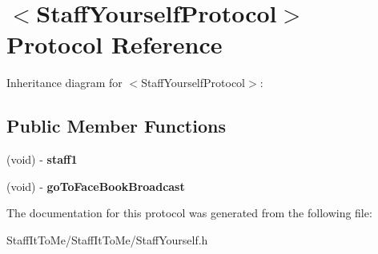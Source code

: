 \hypertarget{protocol_staff_yourself_protocol-p}{
\section{$<$\-Staff\-Yourself\-Protocol$>$ \-Protocol \-Reference}
\label{protocol_staff_yourself_protocol-p}
}


\-Inheritance diagram for $<$\-Staff\-Yourself\-Protocol$>$\-:
\subsection*{\-Public \-Member \-Functions}
\begin{DoxyCompactItemize}
\item 
\hypertarget{protocol_staff_yourself_protocol-p_ab40cba6a24793b656ce1fb7ebf9e71ed}{
(void) -\/ {\bfseries staff1}}
\label{protocol_staff_yourself_protocol-p_ab40cba6a24793b656ce1fb7ebf9e71ed}

\item 
\hypertarget{protocol_staff_yourself_protocol-p_a488ff815ad7cfb59ffdc05e65f9ee6eb}{
(void) -\/ {\bfseries go\-To\-Face\-Book\-Broadcast}}
\label{protocol_staff_yourself_protocol-p_a488ff815ad7cfb59ffdc05e65f9ee6eb}

\end{DoxyCompactItemize}


\-The documentation for this protocol was generated from the following file\-:\begin{DoxyCompactItemize}
\item 
\-Staff\-It\-To\-Me/\-Staff\-It\-To\-Me/\-Staff\-Yourself.\-h\end{DoxyCompactItemize}
